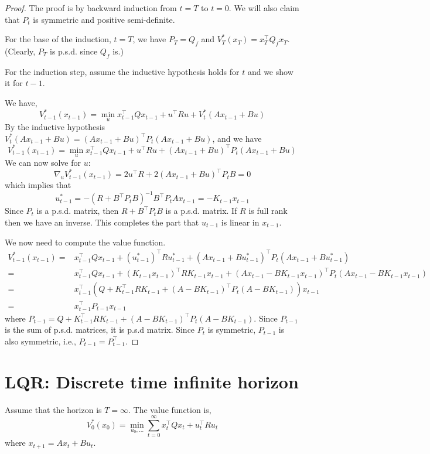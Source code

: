 \begin{proof}
The proof is by backward induction from $t=T$ to $t=0$. We will also
claim that $P_t$ is symmetric and positive semi-definite.

For the base of the induction, $t=T$, we have $P_T=Q_f$ and
$V^*_T(x_T)=x_T^\top Q_f x_T$. (Clearly, $P_T$ is p.s.d. since $Q_f$
is.)

For the induction step, assume the inductive hypothesis holds for
$t$ and we show it for $t-1$.

We have,
\[
V^*_{t-1}(x_{t-1})=\min_u x_{t-1}^\top Qx_{t-1} +u^\top R u
+V^*_{t}(Ax_{t-1}+Bu)
\]
By the inductive hypothesis $V^*_{t}(Ax_{t-1}+Bu)=(Ax_{t-1}+Bu)^\top
P_t(Ax_{t-1}+Bu)$, and we have
\[
V^*_{t-1}(x_{t-1})=\min_u x_{t-1}^\top Qx_{t-1} +u^\top R u
+(Ax_{t-1}+Bu)^\top P_t(Ax_{t-1}+Bu)
\]
We can now solve for $u$:
\[
\nabla_u V_{t-1}^*(x_{t-1})=2u^\top R+2(Ax_{t-1}+Bu)^\top P_t B=0
\]
which implies that
\[
u_{t-1}^*=-(R+B^\top P_tB)^{-1}B^\top P_t A x_{t-1}=-K_{t-1}x_{t-1}
\]
Since $P_t$ is a p.s.d. matrix,  then $R+B^\top P_t B$ is a p.s.d.
matrix. If $R$ is full rank then we have an inverse.
%
This completes the
part that $u_{t-1}$ is linear in $x_{t-1}$.

We now need to compute the value function.
%
\begin{align*}
V^*_{t-1}(x_{t-1}) =& x_{t-1}^\top Qx_{t-1}+(u^*_{t-1})^\top
Ru^*_{t-1} +(Ax_{t-1}+Bu^*_{t-1})^\top P_t (Ax_{t-1}+Bu^*_{t-1})\\
=&x_{t-1}^\top Qx_{t-1}+(K_{t-1}x_{t-1})^\top
RK_{t-1}x_{t-1} +(Ax_{t-1}-BK_{t-1}x_{t-1})^\top P_t (Ax_{t-1}-BK_{t-1}x_{t-1})\\
=& x_{t-1}^\top \left(Q+K^\top_{t-1}RK_{t-1}+(A-BK_{t-1})^\top P_t
(A-BK_{t-1})\right)x_{t-1}\\
=& x_{t-1}^\top P_{t-1}x_{t-1}
\end{align*}
where $P_{t-1}=Q+K^\top_{t-1}RK_{t-1}+(A-BK_{t-1})^\top P_t
(A-BK_{t-1})$. Since $P_{t-1}$ is the sum of p.s.d. matrices, it is
p.s.d matrix. Since $P_t$ is symmetric, $P_{t-1}$ is also symmetric,
i.e., $P_{t-1}=P^\top_{t-1}$.
\end{proof}


\section{LQR: Discrete time infinite horizon}

Assume that the horizon is $T=\infty$. The value function is,
\[
V_0^*(x_0)=\min_{u_0,\ldots} \sum_{t=0}^\infty x_t^\top Q x_t
+u_t^\top R u_t
\]
where $x_{t+1}=Ax_t+Bu_t$.

